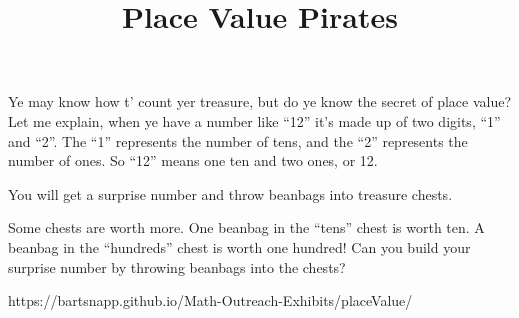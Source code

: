 \documentclass{../exhibit}
\title{Place Value Pirates}
\begin{document}
\begin{context}
Ye may know how t' count yer treasure, but do ye know the secret of place value?
Let me explain, when ye have a number like ``12'' it's made up of two digits, ``1'' and ``2''. The ``1'' represents the number of tens, and the ``2'' represents the number of ones. So ``12'' means one ten and two ones, or 12.
\end{context}

\begin{directions}
You will get a surprise number and throw beanbags into treasure chests.

Some chests are worth more.  One beanbag in the ``tens'' chest is worth ten.  A beanbag in the ``hundreds'' chest is worth one hundred!  Can you build your surprise number by throwing beanbags into the chests?
\end{directions}

\begin{example}
\end{example}

\begin{mathConnections}
  https://bartsnapp.github.io/Math-Outreach-Exhibits/placeValue/
\end{mathConnections}
\end{document}
